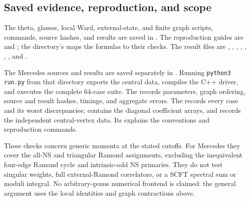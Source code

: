\documentclass[11pt]{article}
\numberwithin{equation}{section}
\begin{document}
\subsection{Saved evidence, reproduction, and scope}

The theta, glasses, local Ward, external-state, and finite graph scripts,
commands, source hashes, and results are saved in
.
The reproduction guides are  and
; the directory's  maps the formulas
to their checks. The result files are ,
, ,
, ,
,
, and
.

The Mercedes sources and results are saved separately in
.
Running \texttt{python3 run.py} from that directory exports the central
data, compiles the C++ driver, and executes the complete 64-case suite.
The  records parameters, graph ordering, source and
result hashes, timings, and aggregate errors. The 
records every case and its worst discrepancies; 
contains the diagonal coefficient arrays, and 
records the independent central-vertex data. Its  explains
the conventions and reproduction commands.

These checks concern generic momenta at the stated cutoffs. For Mercedes
they cover the all-NS and triangular Ramond assignments, excluding the
inequivalent four-edge Ramond cycle and intrinsic-odd NS primaries. They do not test singular
weights, full external-Ramond correlators, or a SCFT spectral sum or moduli
integral. No arbitrary-genus numerical frontend is claimed: the general
argument uses the local identities and graph contractions above.


\appendix


\end{document}
